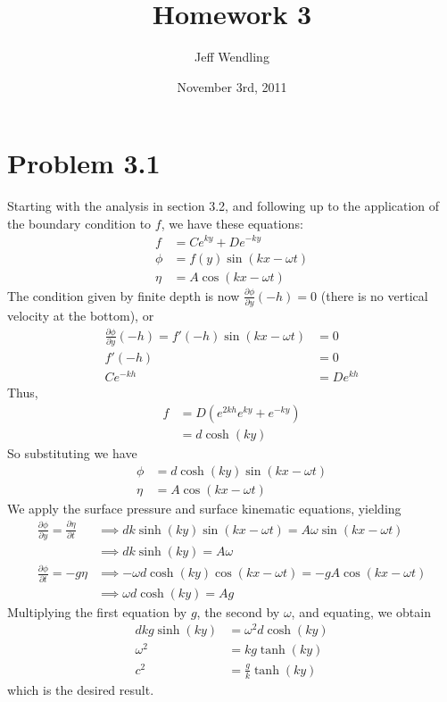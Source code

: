 \documentclass[12pt]{article}
\title{Homework 3}
\author{Jeff Wendling}
\date{November 3rd, 2011}
\newcommand{\eq}[1]{\begin{align*}#1\end{align*}}
\newcommand{\p}[2]{\frac{\partial#1}{\partial#2}}
\begin{document}
\maketitle
\section*{Problem 3.1} Starting with the analysis in section 3.2, and following up to the application of the boundary condition to $f$, we have these equations:
\eq{
	f &= Ce^{ky} + De^{-ky}\\
	\phi &= f(y)\sin(kx - \omega t)\\
	\eta &= A\cos(kx - \omega t)
}
The condition given by finite depth is now $\p{\phi}{y}(-h) = 0$ (there is no vertical velocity at the bottom), or
\eq{
	\p{\phi}{y}(-h) = f'(-h)\sin(kx - \omega t) &= 0\\
	f'(-h) &= 0\\
	Ce^{-kh} &= De^{kh}
}
Thus,
\eq{
	f &= D(e^{2kh}e^{ky} + e^{-ky})\\
	&= d\cosh(ky)
}
So substituting we have
\eq{
	\phi &= d\cosh(ky)\sin(kx - \omega t)\\
	\eta &= A\cos(kx - \omega t)
}
We apply the surface pressure and surface kinematic equations, yielding
\eq{
	\p{\phi}{y} = \p{\eta}{t} &\implies dk\sinh(ky)\sin(kx - \omega t) = A\omega\sin(kx - \omega t)\\
	&\implies dk\sinh(ky) = A\omega\\
	\p{\phi}{t} = -g\eta &\implies -\omega d\cosh(ky)\cos(kx - \omega t) = -gA\cos(kx - \omega t)\\
	&\implies \omega d\cosh(ky) = Ag
}
Multiplying the first equation by $g$, the second by $\omega$, and equating, we obtain
\eq{
	dkg\sinh(ky) &= \omega^2 d \cosh(ky)\\
	\omega^2 &= kg\tanh(ky)\\
	c^2 &= \frac{g}{k}\tanh(ky)
}
which is the desired result.
\end{document}
